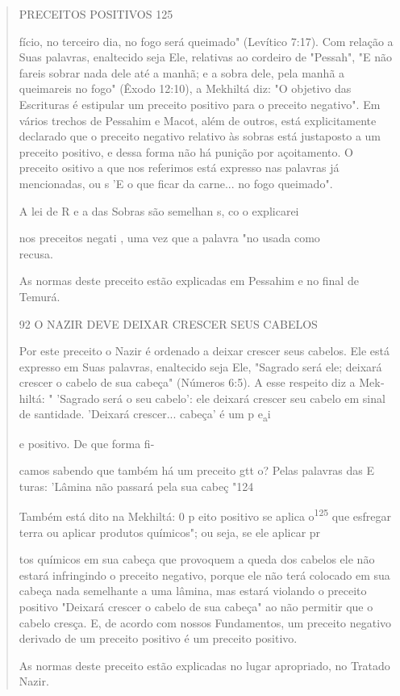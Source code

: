 \begin{quote}
PRECEITOS POSITIVOS 125

fício, no terceiro dia, no fogo será queimado" (Levítico 7:17). Com
relação a Suas palavras, enaltecido seja Ele, relativas ao cordeiro de
"Pessah", "E não fareis so­brar nada dele até a manhã; e a sobra dele,
pela manhã a queimareis no fogo" (Êxodo 12:10), a Mekhiltá diz: "O
objetivo das Escrituras é estipular um preceito positivo para o preceito
negativo". Em vários trechos de Pessahim e Macot, além de outros, está
explicitamente declarado que o preceito negativo relativo às so­bras
está justaposto a um preceito positivo, e dessa forma não há punição por
açoitamento. O preceito ositivo a que nos referimos está expresso nas
palavras já mencionadas, ou s 'E o que ficar da carne... no fogo
queimado".

A lei de R e a das Sobras são semelhan s, co o explicarei

nos preceitos negati , uma vez que a palavra "no usada como\\
recusa.

As normas deste preceito estão explicadas em Pessahim e no final de
Temurá.

92 O NAZIR DEVE DEIXAR CRESCER SEUS CABELOS

Por este preceito o Nazir é ordenado a deixar crescer seus cabelos. Ele
está expresso em Suas palavras, enaltecido seja Ele, "Sagrado será ele;
dei­xará crescer o cabelo de sua cabeça" (Números 6:5). A esse respeito
diz a Mek­hiltá: " 'Sagrado será o seu cabelo': ele deixará crescer seu
cabelo em sinal de santidade. 'Deixará crescer... cabeça' é um p
e\textsubscript{a}i

e positivo. De que forma fi-

camos sabendo que também há um preceito gtt o? Pelas palavras das E
turas: 'Lâmina não passará pela sua cabeç "124

Também está dito na Mekhiltá: 0 p eito positivo se aplica
o\textsuperscript{125} que esfregar terra ou aplicar produtos químicos";
ou seja, se ele aplicar pr

tos químicos em sua cabeça que provoquem a queda dos cabelos ele não
estará infringindo o preceito negativo, porque ele não terá colocado em
sua cabeça nada semelhante a uma lâmina, mas estará violando o preceito
positivo "Dei­xará crescer o cabelo de sua cabeça" ao não permitir que o
cabelo cresça. E, de acordo com nossos Fundamentos, um preceito negativo
derivado de um pre­ceito positivo é um preceito positivo.

As normas deste preceito estão explicadas no lugar apropriado, no
Tratado Nazir.
\end{quote}

